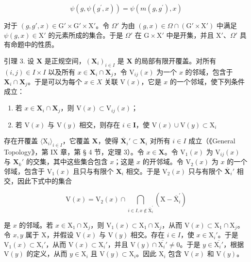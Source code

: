 \[
\psi (g, \psi (g ^ {\prime}, x)) = \psi (m (g, g ^ {\prime}), x)
\]

对于 \((g, g', x) \in \mathrm{G}' \times \mathrm{G}' \times \mathrm{X}'\)。令 \(\Omega'\) 为由 \((g, x) \in \Omega \cap (\mathrm{G}' \times \mathrm{X}')\) 中满足 \(\psi(g, x) \in \mathrm{X}'\) 的元素所成的集合。于是 \(\Omega'\) 在 \(\mathrm{G} \times \mathrm{X}'\) 中是开集，并且 \(\mathrm{X}'\)、\(\Omega'\) 具有命题中的性质。

引理 3. 设 \(\mathbf{X}\) 是正规空间，\((\mathbf{X}_i)_{i\in I}\) 是 \(\mathbf{X}\) 的局部有限开覆盖。对所有 \((i,j)\in I\times I\) 以及所有 \(x\in \mathbf{X}_i\cap \mathbf{X}_j\)，令 \(\mathrm{V}_{ij}(x)\) 为一个 \(x\) 的邻域，包含于 \(\mathbf{X}_i\cap \mathbf{X}_j\)。于是可以为每个 \(x\in X\) 关联 \(\mathrm{V}(x)\)，它是 \(x\) 的一个邻域，使下列条件成立：

\begin{enumerate}
\def\labelenumi{(\alph{enumi})}
\item
  若 \(x \in \mathbf{X}_i \cap \mathbf{X}_j\)，则 \(\mathrm{V}(x) \subset \mathrm{V}_{ij}(x)\)；
\item
  若 \(\mathrm{V}(x)\) 与 \(\mathrm{V}(y)\) 相交，则存在 \(i\in \mathbf{I}\)，使 \(\mathrm{V}(x)\cup \mathrm{V}(y)\subset \mathrm{X}_i\)
\end{enumerate}

存在开覆盖 \(\langle \mathrm{X}_i\rangle_{i\in I}\)，它覆盖 \(\mathbf{X}\)，使得 \(\overline{\mathbf{X}}_i' \subset \mathbf{X}_i\) 对所有 \(i \in I\) 成立（《General Topology》，第 IX 章，第 § 4 节，定理 3）。令 \(x \in \mathbf{X}\)。令 \(\mathrm{V}_1(x)\) 为 \(\mathrm{V}_{ij}(x)\) 与 \(\mathbf{X}_k'\) 的交集，其中这些集合包含 \(x\)；这是 \(x\) 的开邻域。令 \(\mathrm{V}_2(x)\) 为 \(x\) 的一个邻域，包含于 \(\mathrm{V}_1(x)\) 且只与有限个 \(\mathbf{X}_i\) 相交。于是 \(\mathrm{V}_2(x)\) 只与有限个 \(\overline{\mathbf{X}}_i'\) 相交，因此下式中的集合

\[
\mathrm{V} (x) = \mathrm{V} _ {2} (x) \cap \bigcap_ {i \in I, x \notin \overline {{\mathrm{X}}} _ {i} ^ {\prime}} (\mathrm{X} - \overline {{\mathrm{X}}} _ {i} ^ {\prime})
\]

是 \(x\) 的邻域。若 \(x \in \mathrm{X}_1 \cap \mathrm{X}_j\)，则 \(\mathrm{V}_1(x) \subset \mathrm{X}_1 \cap \mathrm{X}_j\)，从而 \(\mathrm{V}(x) \subset \mathrm{X}_1 \cap \mathrm{X}_j\)。令 \(x, y\) 属于 \(\mathrm{X}\)，并假设 \(\mathrm{V}(x)\) 与 \(\mathrm{V}(y)\) 相交。存在 \(i \in I\)，使 \(x \in \mathrm{X}_i'\)。于是 \(\mathrm{V}_1(x) \subset \mathrm{X}_i'\)，从而 \(\mathrm{V}(x) \subset \mathrm{X}_i'\)，并且 \(\mathrm{V}(y) \cap \overline{\mathrm{X}_i'} \neq 0\)。于是 \(y \in \overline{\mathrm{X}_i'}\)，根据 \(\mathrm{V}(y)\) 的定义，从而 \(y \in \mathrm{X}_i\) 且 \(\mathrm{V}(y) \subset \mathrm{X}_i\)。因此 \(\mathrm{X}_i\) 包含 \(\mathrm{V}(x)\) 和 \(\mathrm{V}(y)\)。

